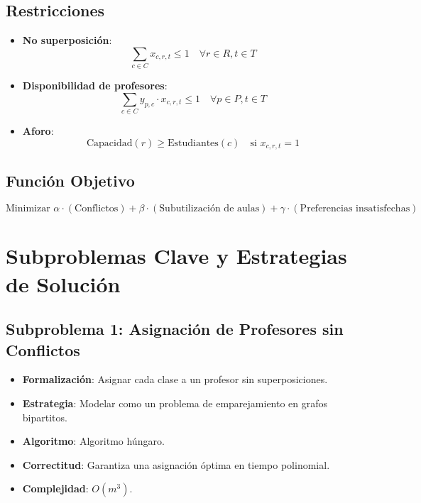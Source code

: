 \documentclass[12pt, a4paper]{article}
\begin{document}
\subsection{Restricciones}
\begin{itemize}
    \item \textbf{No superposición}: 
        \[
        \sum_{c \in C} x_{c, r, t} \leq 1 \quad \forall r \in R, t \in T
        \]
    \item \textbf{Disponibilidad de profesores}:
        \[
        \sum_{c \in C} y_{p, c} \cdot x_{c, r, t} \leq 1 \quad \forall p \in P, t \in T
        \]
    \item \textbf{Aforo}:
        \[
        \text{Capacidad}(r) \geq \text{Estudiantes}(c) \quad \text{si } x_{c, r, t} = 1
        \]
\end{itemize}

\subsection{Función Objetivo}
\[
\text{Minimizar } \alpha \cdot (\text{Conflictos}) + \beta \cdot (\text{Subutilización de aulas}) + \gamma \cdot (\text{Preferencias insatisfechas})
\]

\section{Subproblemas Clave y Estrategias de Solución}
\subsection{Subproblema 1: Asignación de Profesores sin Conflictos}
\begin{itemize}
    \item \textbf{Formalización}: Asignar cada clase a un profesor sin superposiciones.
    \item \textbf{Estrategia}: Modelar como un problema de emparejamiento en grafos bipartitos.
    \item \textbf{Algoritmo}: Algoritmo húngaro.
    \item \textbf{Correctitud}: Garantiza una asignación óptima en tiempo polinomial.
    \item \textbf{Complejidad}: \( O(m^3) \).
\end{itemize}
\end{document}
